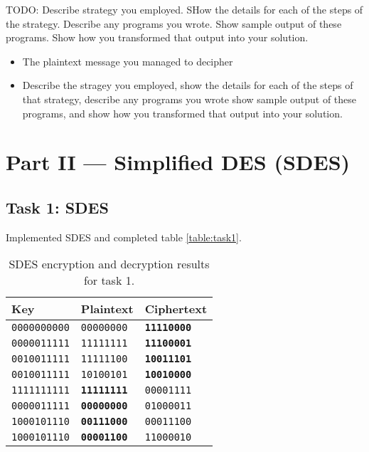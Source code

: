 \documentclass[a4paper,english,12pt]{article}
\begin{document}
TODO: Describe strategy you employed. SHow the details for each of the steps of
the strategy. Describe any programs you wrote. Show sample output of these
programs. Show how you transformed that output into your solution.

\begin{itemize}
  \item The plaintext message you managed to decipher
  \item Describe the stragey you employed, show the details for each of the
    steps of that strategy, describe any programs you wrote show sample output
    of these programs, and show how you transformed that output into your
    solution.
\end{itemize}

\section{Part II --- Simplified DES (SDES)}

\subsection{Task 1: SDES}

Implemented SDES \cite{stallings2006cryptography} and completed table
\vref{table:task1}.

\begin{table}
  \centering
  \begin{tabular}{@{}lll@{}}
    \toprule
    Key &
    Plaintext &
    Ciphertext \\
    \midrule
    \texttt{0000000000} & \texttt{00000000} & \texttt{\textbf{11110000}} \\
    \texttt{0000011111} & \texttt{11111111} & \texttt{\textbf{11100001}} \\
    \texttt{0010011111} & \texttt{11111100} & \texttt{\textbf{10011101}} \\
    \texttt{0010011111} & \texttt{10100101} & \texttt{\textbf{10010000}} \\
    \texttt{1111111111} & \texttt{\textbf{11111111}} & \texttt{00001111} \\
    \texttt{0000011111} & \texttt{\textbf{00000000}} & \texttt{01000011} \\
    \texttt{1000101110} & \texttt{\textbf{00111000}} & \texttt{00011100} \\
    \texttt{1000101110} & \texttt{\textbf{00001100}} & \texttt{11000010} \\
    \bottomrule
  \end{tabular}
  \caption{SDES encryption and decryption results for task 1.}
  \label{table:task1}
\end{table}
\end{document}
